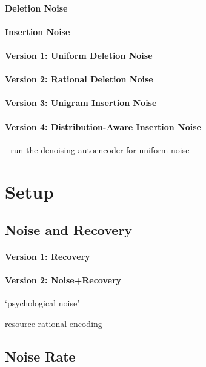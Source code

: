 \documentclass[11pt,a4paper]{article}
\begin{document}
\paragraph{Deletion Noise}

\paragraph{Insertion Noise}

\paragraph{Version 1: Uniform Deletion Noise}

\paragraph{Version 2: Rational Deletion Noise}

\paragraph{Version 3: Unigram Insertion Noise}

\paragraph{Version 4: Distribution-Aware Insertion Noise}

- run the denoising autoencoder for uniform noise

\section{Setup}

\subsection{Noise and Recovery}
\paragraph{Version 1: Recovery}

\paragraph{Version 2: Noise+Recovery}

`psychological noise'

resource-rational encoding

\subsection{Noise Rate}
\end{document}
